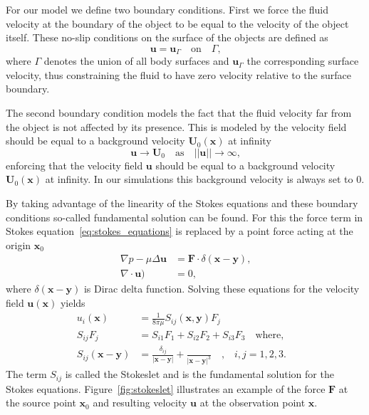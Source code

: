 \documentclass[a4paper,11pt]{kth-mag}
\begin{document}
For our model we define two boundary conditions. First we force the fluid velocity at the boundary of the object to be equal to the velocity of the object itself. These no-slip conditions on the surface of the objects are defined as
\begin{equation}
  \label{eq:boundary_condition_surface}
  \mathbf{u} = \mathbf{u}_\Gamma  \quad \text{on} \quad  \Gamma \text{,}
\end{equation}
where $\Gamma$ denotes the union of all body surfaces and $\mathbf{u}_\Gamma$ the corresponding surface velocity, thus constraining the fluid to have zero velocity relative to the surface boundary.

The second boundary condition models the fact that the fluid velocity far from the object is not affected by its presence. This is modeled by the velocity field should be equal to a background velocity $\mathbf{U}_0(\mathbf{x})$ at infinity
\begin{equation}
  \label{eq:boundary_condition_background}
  \mathbf{u} \rightarrow \mathbf{U}_0 \quad \text{as} \quad ||\mathbf{u}|| \rightarrow \infty \text{,}
\end{equation}
enforcing that the velocity field $\mathbf{u}$ should be equal to a background velocity $\mathbf{U}_0(\mathbf{x})$ at infinity. In our simulations this background velocity is always set to $0$.

By taking advantage of the linearity of the Stokes equations and these boundary conditions so-called fundamental solution can be found. For this the force term in Stokes equation~\eqref{eq:stokes_equations} is replaced by a point force acting at the origin $\mathbf{x}_0$
\begin{equation}
  \label{eq:stokes_equations_point}
  \begin{aligned}
    \nabla p - \mu \Delta \mathbf{u} &= \mathbf{F} \cdot \delta(\mathbf{x} - \mathbf{y}) \text{,} \\
    \nabla \cdot \mathbf{u}) &= 0\text{,}
  \end{aligned}
\end{equation}
where $\delta(\mathbf{x} - \mathbf{y})$ is Dirac delta function. Solving these equations for the velocity field $\mathbf{u}(\mathbf{x})$ yields
\begin{equation}
  \label{eq:stokeslet}
  \begin{aligned}
    u_i(\mathbf{x}) &= \frac{1}{8\pi\mu}S_{ij}(\mathbf{x},\mathbf{y})F_j \\
    S_{ij}F_j &= S_{i1}F_1 + S_{i2}F_2 + S_{i3}F_3 \quad \text{where,} \quad \\
    S_{ij}(\mathbf{x} - \mathbf{y}) &= \frac{\delta_{ij}}{|\mathbf{x}-\mathbf{y}|} + \frac{}{|\mathbf{x}-\mathbf{y}|^3}\quad \text{,} \quad i,j=1,2,3\text{.}
  \end{aligned}
\end{equation}
The term $S_{ij}$ is called the Stokeslet and is the fundamental solution for the Stokes equations. Figure~\ref{fig:stokeslet} illustrates an example of the force $\mathbf{F}$ at the source point $\mathbf{x}_0$ and resulting velocity $\mathbf{u}$ at the observation point $\mathbf{x}$.
\end{document}
